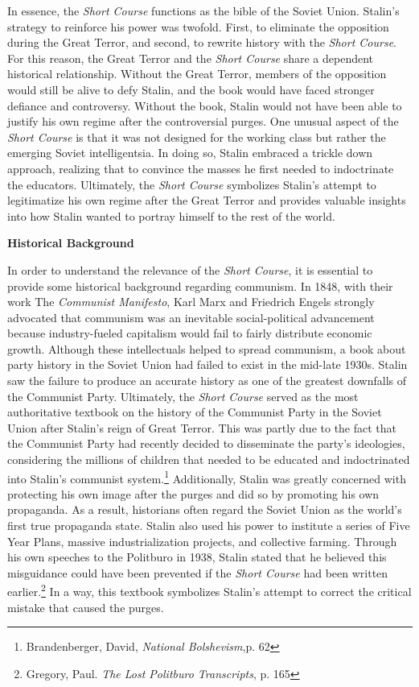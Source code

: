 \documentclass[a4paper, twocolumn]{article}
\begin{document}
In essence, the \emph{Short Course} functions as the bible of the
Soviet Union. Stalin's strategy to reinforce his power was
twofold. First, to eliminate the opposition during the Great
Terror, and second, to rewrite history with the \emph{Short
  Course}. For this reason, the Great Terror and the \emph{Short
  Course} share a dependent historical relationship. Without the
Great Terror, members of the opposition would still be alive
to defy Stalin, and the book would have faced stronger
defiance and controversy. Without the book, Stalin would not
have been able to justify his own regime after the
controversial purges. One unusual aspect of the \emph{Short Course}
is that it was not designed for the working class but rather
the emerging Soviet intelligentsia. In doing so, Stalin
embraced a trickle down approach, realizing that to convince
the masses he first needed to indoctrinate the
educators. Ultimately, the \emph{Short Course} symbolizes Stalin's
attempt to legitimatize his own regime after the Great Terror
and provides valuable insights into how Stalin wanted to
portray himself to the rest of the world.


\begin{center}\textbf{Historical Background}\end{center}

In order to understand the relevance of the \emph{Short Course}, it is
essential to provide some historical background regarding
communism. In 1848, with their work The \emph{Communist Manifesto}, Karl Marx
and Friedrich Engels strongly advocated that communism was an
inevitable social-political advancement because industry-fueled
capitalism would fail to fairly distribute economic growth. Although
these intellectuals helped to spread communism, a book about party history in the
Soviet Union had failed to exist in the mid-late 1930s. Stalin saw the
failure to produce an accurate history as one of the greatest
downfalls of the Communist Party. Ultimately, the \emph{Short Course} served
as the most authoritative textbook on the history of the Communist
Party in the Soviet Union after Stalin's reign of Great Terror. This
was partly due to the fact that the Communist Party had recently
decided to disseminate the party's ideologies, considering the
millions of children that needed to be educated and indoctrinated into
Stalin’s communist system.\footnote{Brandenberger, David, \emph{National Bolshevism},p. 62} Additionally, Stalin was greatly
concerned with protecting his own image after the purges and did so by
promoting his own propaganda. As a result, historians often regard the
Soviet Union as the world's first true propaganda state. Stalin also
used his power to institute a series of Five Year Plans, massive
industrialization projects, and collective farming. Through his own
speeches to the Politburo in 1938, Stalin stated that he believed this
misguidance could have been prevented if the \emph{Short Course} had been
written earlier.\footnote{Gregory, Paul. \emph{The Lost Politburo Transcripts}, p. 165} In a way, this textbook symbolizes Stalin's
attempt to correct the critical mistake that caused the purges.
\end{document}
